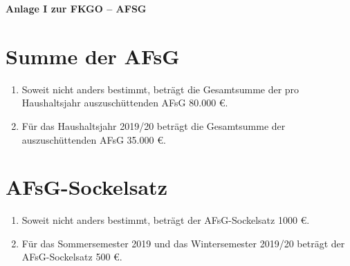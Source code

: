 \documentclass{article}
\begin{document}
\begin{center}
    \huge \textbf{Anlage I zur FKGO -- AFSG}
\end{center}


\section{Summe der AFsG}
\begin{enumerate}[(1)]
    \item Soweit nicht anders bestimmt, beträgt die Gesamtsumme der pro Haushaltsjahr auszuschüttenden AFsG 80.000 €.
    \item Für das Haushaltsjahr 2019/20 beträgt die Gesamtsumme der auszuschüttenden AFsG 35.000 €.
\end{enumerate}

\section{AFsG-Sockelsatz}
\begin{enumerate}[(1)]
	\item Soweit nicht anders bestimmt, beträgt der AFsG-Sockelsatz 1000 €.
    \item Für das Sommersemester 2019 und das Wintersemester 2019/20 beträgt der AFsG-Sockelsatz 500 €.
\end{enumerate}
\end{document}
